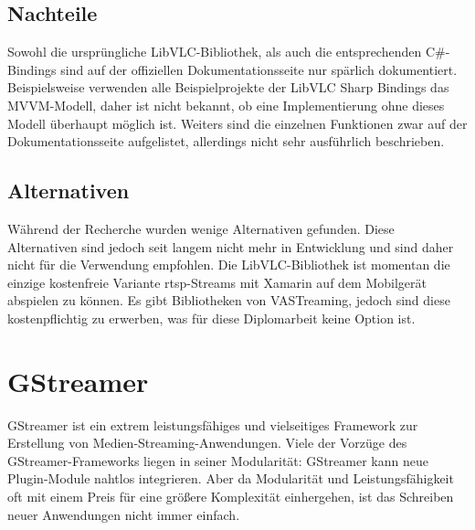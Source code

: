 \subsection{Nachteile}
Sowohl die ursprüngliche LibVLC-Bibliothek, als auch die entsprechenden C\#-Bindings sind auf der offiziellen Dokumentationsseite nur spärlich dokumentiert.\cite[vgl.][]{libvlc-sharp-doc}
Beispielsweise verwenden alle Beispielprojekte der LibVLC Sharp Bindings das MVVM-Modell, daher ist nicht bekannt, ob eine Implementierung ohne dieses Modell überhaupt möglich ist.
Weiters sind die einzelnen Funktionen zwar auf der Dokumentationsseite aufgelistet, allerdings nicht sehr ausführlich beschrieben. \cite[vgl.][]{libvlc-sharp-doc}

\subsection{Alternativen}
Während der Recherche wurden wenige Alternativen gefunden. Diese Alternativen sind jedoch seit langem nicht mehr in Entwicklung und sind daher nicht für die Verwendung empfohlen. Die LibVLC-Bibliothek ist momentan die einzige kostenfreie Variante \acs{rtsp}-Streams mit Xamarin auf dem Mobilgerät abspielen zu können. Es gibt Bibliotheken von VASTreaming, jedoch sind diese kostenpflichtig zu erwerben, was für diese Diplomarbeit keine Option ist. \cite[vgl.][Pricing]{vastreaming}

\section{GStreamer}
GStreamer ist ein extrem leistungsfähiges und vielseitiges Framework zur Erstellung von Medien-Streaming-Anwendungen.
Viele der Vorzüge des GStreamer-Frameworks liegen in seiner Modularität:
GStreamer kann neue Plugin-Module nahtlos integrieren.
Aber da Modularität und Leistungsfähigkeit oft mit einem Preis für eine größere Komplexität einhergehen, ist das Schreiben neuer Anwendungen nicht immer einfach.
\cite[aus dem Englischen übersetzt]{gstreamer}\par

